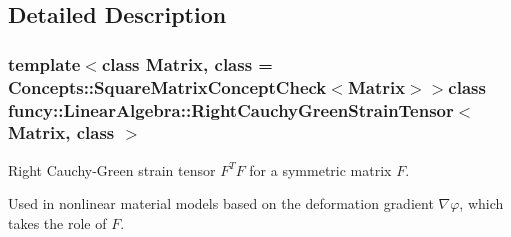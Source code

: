 \subsection{Detailed Description}
\subsubsection*{template$<$class Matrix, class = Concepts\-::\-Square\-Matrix\-Concept\-Check$<$\-Matrix$>$$>$class funcy\-::\-Linear\-Algebra\-::\-Right\-Cauchy\-Green\-Strain\-Tensor$<$ Matrix, class $>$}

Right Cauchy-\/\-Green strain tensor $ F^T F $ for a symmetric matrix $ F $. 

Used in nonlinear material models based on the deformation gradient $\nabla\varphi$, which takes the role of $F$. 

